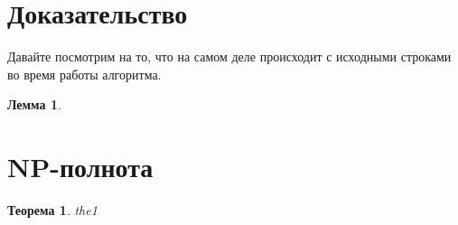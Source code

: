 \documentclass[a4paper,12pt]{article}
\newtheorem{theorem}{Теорема}
\newtheorem{lemma}{Лемма}
\begin{document}
\section{Доказательство}
Давайте посмотрим на то, что на самом деле происходит с исходными строками во время работы алгоритма.

\begin{lemma}

\end{lemma}

\section{NP-полнота}

\begin{theorem}
the1
\end{theorem}
\end{document}
